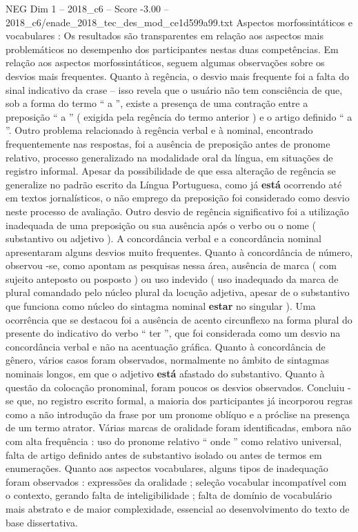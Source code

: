 \begin{textsample}{NEG Dim 1 – 2018\_c6 – Score -3.00 – 2018\_c6/enade\_2018\_tec\_des\_mod\_ce1d599a99.txt}
Aspectos morfossintáticos e vocabulares : Os resultados são transparentes em relação aos aspectos mais problemáticos no desempenho dos participantes nestas duas competências.
Em relação aos aspectos morfossintáticos, seguem algumas observações sobre os desvios mais frequentes.
Quanto à regência, o desvio mais frequente foi a falta do sinal indicativo da crase – isso revela que o usuário não tem consciência de que, sob a forma do termo “ a ”, existe a presença de uma contração entre a preposição “ a ” ( exigida pela regência do termo anterior ) e o artigo definido “ a ”.
Outro problema relacionado à regência verbal e à nominal, encontrado frequentemente nas respostas, foi a ausência de preposição antes de pronome relativo, processo generalizado na modalidade oral da língua, em situações de registro informal.
Apesar da possibilidade de que essa alteração de regência se generalize no padrão escrito da Língua Portuguesa, como já \textbf{está} ocorrendo até em textos jornalísticos, o não emprego da preposição foi considerado como desvio neste processo de avaliação.
Outro desvio de regência significativo foi a utilização inadequada de uma preposição ou sua ausência após o verbo ou o nome ( substantivo ou adjetivo ).
A concordância verbal e a concordância nominal apresentaram alguns desvios muito frequentes.
Quanto à concordância de número, observou -se, como apontam as pesquisas nessa área, ausência de marca ( com sujeito anteposto ou posposto ) ou uso indevido ( uso inadequado da marca de plural comandado pelo núcleo plural da locução adjetiva, apesar de o substantivo que funciona como núcleo do sintagma nominal \textbf{estar} no singular ).
Uma ocorrência que se destacou foi a ausência de acento circunflexo na forma plural do presente do indicativo do verbo “ ter ”, que foi considerada como um desvio na concordância verbal e não na acentuação gráfica.
Quanto à concordância de gênero, vários casos foram observados, normalmente no âmbito de sintagmas nominais longos, em que o adjetivo \textbf{está} afastado do substantivo.
Quanto à questão da colocação pronominal, foram poucos os desvios observados.
Concluiu -se que, no registro escrito formal, a maioria dos participantes já incorporou regras como a não introdução da frase por um pronome oblíquo e a próclise na presença de um termo atrator.
Várias marcas de oralidade foram identificadas, embora não com alta frequência : uso do pronome relativo “ onde ” como relativo universal, falta de artigo definido antes de substantivo isolado ou antes de termos em enumerações.
Quanto aos aspectos vocabulares, alguns tipos de inadequação foram observados : expressões da oralidade ; seleção vocabular incompatível com o contexto, gerando falta de inteligibilidade ; falta de domínio de vocabulário mais abstrato e de maior complexidade, essencial ao desenvolvimento do texto de base dissertativa.

\end{textsample}
